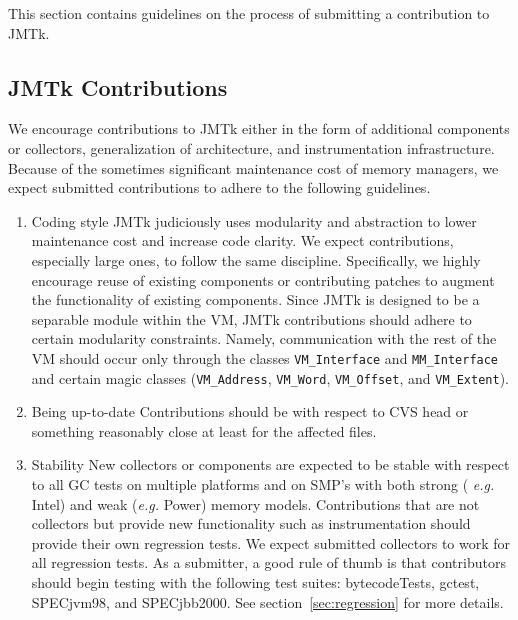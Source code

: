 This section contains guidelines on the process of
submitting a contribution to JMTk.


\subsection{JMTk Contributions}

We encourage contributions to JMTk either in the form of additional
components or collectors, generalization of architecture,
and instrumentation infrastructure.  Because of the sometimes significant
maintenance cost of memory managers, we expect submitted contributions
to adhere to the following guidelines.


\begin{enumerate}

\item{Coding style}  
JMTk judiciously uses modularity and abstraction to lower maintenance
cost and increase code clarity.  We expect contributions, especially
large ones, to follow the same discipline.  Specifically, we highly
encourage reuse of existing components or contributing patches to
augment the functionality of existing components.  Since JMTk is
designed to be a separable module within the VM, JMTk contributions
should adhere to certain modularity constraints.  Namely,
communication with the rest of the VM should occur only through the
classes {\tt VM\_Interface} and {\tt MM\_Interface} and certain magic classes
({\tt VM\_Address}, {\tt VM\_Word}, {\tt VM\_Offset}, and {\tt VM\_Extent}).

\item{Being up-to-date}  
Contributions should be with respect to CVS head or something
reasonably close at least for the affected files.

\item{Stability}  
New collectors or components are expected to be stable with respect to
all GC tests on multiple platforms and on SMP's with both strong ({\it
e.g.} Intel) and weak ({\it e.g.} Power) memory models.  Contributions
that are not collectors but provide new functionality such as
instrumentation should provide their own regression tests.
We expect submitted collectors to work for all regression tests.
As a submitter, a good rule of thumb is that contributors should begin
testing with the following test suites: bytecodeTests, gctest, 
SPECjvm98\trademark, and SPECjbb2000\trademark.  See section~\ref{sec:regression}
for more details.


\end{enumerate}
